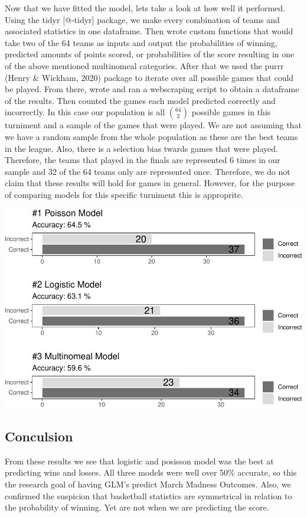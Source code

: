 \documentclass[
  man,floatsintext]{apa6}
\begin{document}
Now that we have fitted the model, lets take a look at how well it performed. Using the tidyr {[}@-tidyr{]} package, we make every combination of teams and associated statistics in one dataframe. Then wrote custom functions that would take two of the 64 teams as inputs and output the probabilities of winning, predicted amounts of points scored, or probabilities of the score resulting in one of the above mentioned multinomeal categories. After that we used the purrr (Henry \& Wickham, 2020) package to iterate over all possible games that could be played. From there, wrote and ran a webscraping script to obtain a dataframe of the results. Then counted the games each model predicted correctly and incorrectly. In this case our population is all \({64\choose 2}\) possible games in this turniment and a sample of the games that were played. We are not assuming that we have a random sample from the whole population as these are the best teams in the league. Also, there is a selection bias twards games that were played. Therefore, the teams that played in the finals are represented 6 times in our sample and 32 of the 64 teams only are represented once. Therefore, we do not claim that these results will hold for games in general. However, for the purpose of comparing models for this specific turniment this is approprite.

\includegraphics{paper_files/figure-latex/unnamed-chunk-6-1.pdf}

\hypertarget{conculsion}{%
\subsection{Conculsion}\label{conculsion}}

From these results we see that logistic and posisson model was the best at predicting wins and losses. All three models were well over 50\% accurate, so this the research goal of having GLM's predict March Madness Outcomes. Also, we confirmed the suspicion that basketball statistics are symmetrical in relation to the probability of winning. Yet are not when we are predicting the score.
\end{document}
